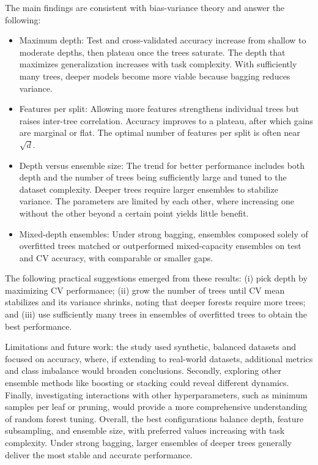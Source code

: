 \documentclass[conference]{IEEEtran}
\begin{document}
The main findings are consistent with bias-variance theory and answer the following:
\begin{itemize}
  \item Maximum depth: Test and cross-validated accuracy increase from shallow to moderate depths, then plateau once the trees saturate. The depth that maximizes generalization increases with task complexity. With sufficiently many trees, deeper models become more viable because bagging reduces variance.
  \item Features per split: Allowing more features strengthens individual trees but raises inter-tree correlation. Accuracy improves to a plateau, after which gains are marginal or flat. The optimal number of features per split is often near $\sqrt{d}$.
  \item Depth versus ensemble size: The trend for better performance includes both depth and the number of trees being sufficiently large and tuned to the dataset complexity. Deeper trees require larger ensembles to stabilize variance. The parameters are limited by each other, where increasing one without the other beyond a certain point yields little benefit.
  \item Mixed-depth ensembles: Under strong bagging, ensembles composed solely of overfitted trees matched or outperformed mixed-capacity ensembles on test and CV accuracy, with comparable or smaller gaps. 
\end{itemize}

The following practical suggestions emerged from these results: (i) pick depth by maximizing CV performance; (ii) grow the number of trees until CV mean stabilizes and its variance shrinks, noting that deeper forests require more trees; and (iii) use sufficiently many trees in ensembles of overfitted trees to obtain the best performance.

Limitations and future work: the study used synthetic, balanced datasets and focused on accuracy, where, if extending to real-world datasets, additional metrics and class imbalance would broaden conclusions. Secondly, exploring other ensemble methods like boosting or stacking could reveal different dynamics. Finally, investigating interactions with other hyperparameters, such as minimum samples per leaf or pruning, would provide a more comprehensive understanding of random forest tuning.
Overall, the best configurations balance depth, feature subsampling, and ensemble size, with preferred values increasing with task complexity. Under strong bagging, larger ensembles of deeper trees generally deliver the most stable and accurate performance.
\end{document}

